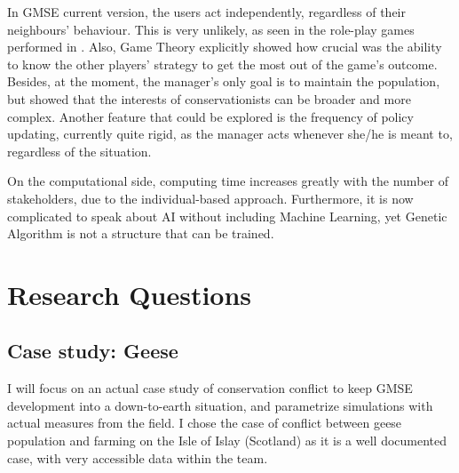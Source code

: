 \documentclass[12pt,a4paper]{article}
\begin{document}
In GMSE current version, the users act independently, regardless of their neighbours' behaviour.
This is very unlikely, as seen in the role-play games performed in \cite{redpath2018games}.
Also, Game Theory explicitly showed how crucial was the ability to know the other players' strategy to get the most out of the game's outcome.
Besides, at the moment, the manager's only goal is to maintain the population, but \cite{holmes2017understanding} showed that the interests of conservationists can be broader and more complex.
Another feature that could be explored is the frequency of policy updating, currently quite rigid, as the manager acts whenever she/he is meant to, regardless of the situation.

On the computational side, computing time increases greatly with the number of stakeholders, due to the individual-based approach.
Furthermore, it is now complicated to speak about AI without including Machine Learning, yet Genetic Algorithm is not a structure that can be trained.

\section{Research Questions}

\subsection{Case study: Geese}

I will focus on an actual case study of conservation conflict to keep GMSE development into a down-to-earth situation, and parametrize simulations with actual measures from the field.
I chose the case of conflict between geese population and farming on the Isle of Islay (Scotland) as it is a well documented case, with very accessible data within the team.
\end{document}
